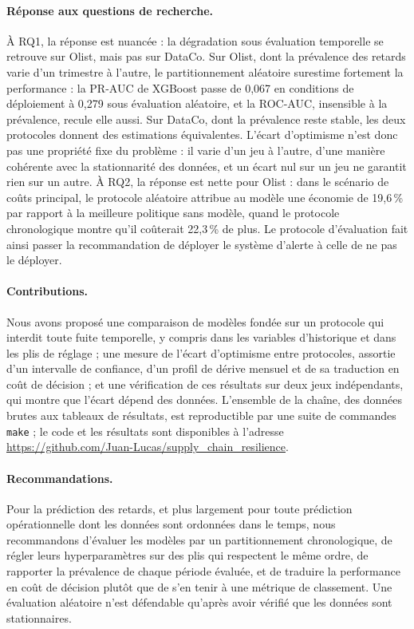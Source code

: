 \documentclass[11pt,a4paper]{article}
\theoremstyle{definition}
\begin{document}
\paragraph{Réponse aux questions de recherche.} À RQ1, la réponse est nuancée : la dégradation sous évaluation temporelle se retrouve sur Olist, mais pas sur DataCo. Sur Olist, dont la prévalence des retards varie d'un trimestre à l'autre, le partitionnement aléatoire surestime fortement la performance : la PR-AUC de XGBoost passe de 0,067 en conditions de déploiement à 0,279 sous évaluation aléatoire, et la ROC-AUC, insensible à la prévalence, recule elle aussi. Sur DataCo, dont la prévalence reste stable, les deux protocoles donnent des estimations équivalentes. L'écart d'optimisme n'est donc pas une propriété fixe du problème : il varie d'un jeu à l'autre, d'une manière cohérente avec la stationnarité des données, et un écart nul sur un jeu ne garantit rien sur un autre. À RQ2, la réponse est nette pour Olist : dans le scénario de coûts principal, le protocole aléatoire attribue au modèle une économie de 19,6\,\% par rapport à la meilleure politique sans modèle, quand le protocole chronologique montre qu'il coûterait 22,3\,\% de plus. Le protocole d'évaluation fait ainsi passer la recommandation de déployer le système d'alerte à celle de ne pas le déployer.

\paragraph{Contributions.} Nous avons proposé une comparaison de modèles fondée sur un protocole qui interdit toute fuite temporelle, y compris dans les variables d'historique et dans les plis de réglage ; une mesure de l'écart d'optimisme entre protocoles, assortie d'un intervalle de confiance, d'un profil de dérive mensuel et de sa traduction en coût de décision ; et une vérification de ces résultats sur deux jeux indépendants, qui montre que l'écart dépend des données. L'ensemble de la chaîne, des données brutes aux tableaux de résultats, est reproductible par une suite de commandes \texttt{make} ; le code et les résultats sont disponibles à l'adresse \url{https://github.com/Juan-Lucas/supply_chain_resilience}.

\paragraph{Recommandations.} Pour la prédiction des retards, et plus largement pour toute prédiction opérationnelle dont les données sont ordonnées dans le temps, nous recommandons d'évaluer les modèles par un partitionnement chronologique, de régler leurs hyperparamètres sur des plis qui respectent le même ordre, de rapporter la prévalence de chaque période évaluée, et de traduire la performance en coût de décision plutôt que de s'en tenir à une métrique de classement. Une évaluation aléatoire n'est défendable qu'après avoir vérifié que les données sont stationnaires.
\end{document}

